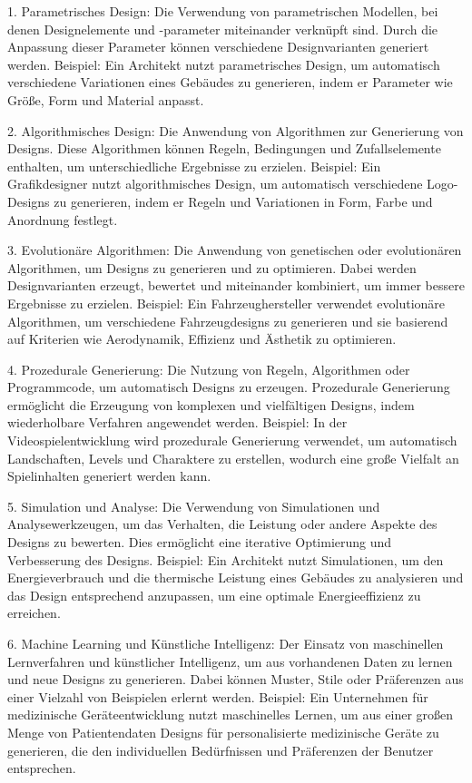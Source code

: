 
1. Parametrisches Design: Die Verwendung von parametrischen Modellen, bei denen Designelemente und -parameter miteinander verknüpft sind. Durch die Anpassung dieser Parameter können verschiedene Designvarianten generiert werden. Beispiel: Ein Architekt nutzt parametrisches Design, um automatisch verschiedene Variationen eines Gebäudes zu generieren, indem er Parameter wie Größe, Form und Material anpasst.

2. Algorithmisches Design: Die Anwendung von Algorithmen zur Generierung von Designs. Diese Algorithmen können Regeln, Bedingungen und Zufallselemente enthalten, um unterschiedliche Ergebnisse zu erzielen. Beispiel: Ein Grafikdesigner nutzt algorithmisches Design, um automatisch verschiedene Logo-Designs zu generieren, indem er Regeln und Variationen in Form, Farbe und Anordnung festlegt.

3. Evolutionäre Algorithmen: Die Anwendung von genetischen oder evolutionären Algorithmen, um Designs zu generieren und zu optimieren. Dabei werden Designvarianten erzeugt, bewertet und miteinander kombiniert, um immer bessere Ergebnisse zu erzielen. Beispiel: Ein Fahrzeughersteller verwendet evolutionäre Algorithmen, um verschiedene Fahrzeugdesigns zu generieren und sie basierend auf Kriterien wie Aerodynamik, Effizienz und Ästhetik zu optimieren.

4. Prozedurale Generierung: Die Nutzung von Regeln, Algorithmen oder Programmcode, um automatisch Designs zu erzeugen. Prozedurale Generierung ermöglicht die Erzeugung von komplexen und vielfältigen Designs, indem wiederholbare Verfahren angewendet werden. Beispiel: In der Videospielentwicklung wird prozedurale Generierung verwendet, um automatisch Landschaften, Levels und Charaktere zu erstellen, wodurch eine große Vielfalt an Spielinhalten generiert werden kann.

5. Simulation und Analyse: Die Verwendung von Simulationen und Analysewerkzeugen, um das Verhalten, die Leistung oder andere Aspekte des Designs zu bewerten. Dies ermöglicht eine iterative Optimierung und Verbesserung des Designs. Beispiel: Ein Architekt nutzt Simulationen, um den Energieverbrauch und die thermische Leistung eines Gebäudes zu analysieren und das Design entsprechend anzupassen, um eine optimale Energieeffizienz zu erreichen.

6. Machine Learning und Künstliche Intelligenz: Der Einsatz von maschinellen Lernverfahren und künstlicher Intelligenz, um aus vorhandenen Daten zu lernen und neue Designs zu generieren. Dabei können Muster, Stile oder Präferenzen aus einer Vielzahl von Beispielen erlernt werden. Beispiel: Ein Unternehmen für medizinische Geräteentwicklung nutzt maschinelles Lernen, um aus einer großen Menge von Patientendaten Designs für personalisierte medizinische Geräte zu generieren, die den individuellen Bedürfnissen und Präferenzen der Benutzer entsprechen.

